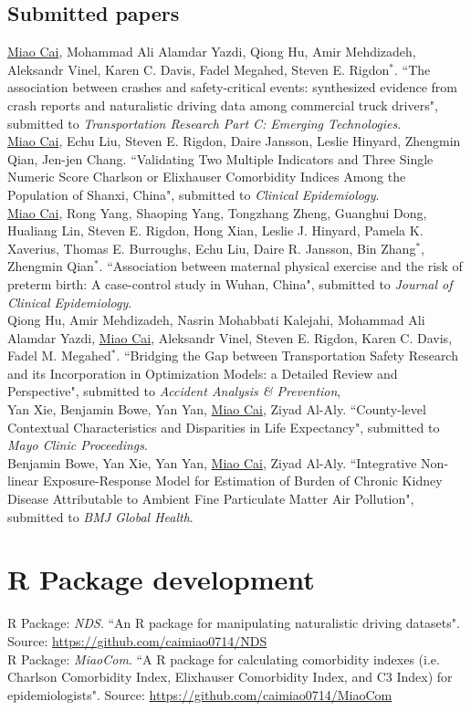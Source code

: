 \documentclass[11pt, a4paper]{article}
\newcommand{\years}[1]{\marginnote{\scriptsize #1}}
\begin{document}
\subsection*{Submitted papers}
\noindent
\years{2019}\underline{Miao Cai},  Mohammad Ali Alamdar Yazdi, Qiong Hu, Amir Mehdizadeh, Aleksandr Vinel, Karen C. Davis, Fadel Megahed, Steven E. Rigdon$^\ast$. ``The association between crashes and safety-critical events: synthesized evidence from crash reports and naturalistic driving data among commercial truck drivers", submitted to \emph{Transportation Research Part C: Emerging Technologies}.\\
\years{2019}\underline{Miao Cai}, Echu Liu, Steven E. Rigdon, Daire Jansson, Leslie Hinyard, Zhengmin Qian, Jen-jen Chang. ``Validating Two Multiple Indicators and Three Single Numeric Score Charlson or Elixhauser Comorbidity Indices Among the Population of Shanxi, China", submitted to \emph{Clinical Epidemiology}.\\
\years{2019}\underline{Miao Cai}, Rong Yang, Shaoping Yang, Tongzhang Zheng, Guanghui Dong, Hualiang Lin, Steven E. Rigdon, Hong Xian, Leslie J. Hinyard, Pamela K. Xaverius, Thomas E. Burroughs, Echu Liu, Daire R. Jansson, Bin Zhang$^\ast$, Zhengmin Qian$^\ast$. ``Association between maternal physical exercise and the risk of preterm birth: A case-control study in Wuhan, China", submitted to \emph{Journal of Clinical Epidemiology}.\\
\years{2019}Qiong Hu, Amir Mehdizadeh, Nasrin Mohabbati Kalejahi, Mohammad Ali Alamdar Yazdi, \underline{Miao Cai}, Aleksandr Vinel, Steven E. Rigdon, Karen C. Davis, Fadel M. Megahed$^\ast$. ``Bridging the Gap between Transportation Safety Research and its Incorporation in Optimization Models: a Detailed Review and Perspective", submitted to \emph{Accident Analysis \& Prevention},\\
\years{2019}Yan Xie, Benjamin Bowe, Yan Yan, \underline{Miao Cai}, Ziyad Al-Aly. ``County-level Contextual Characteristics and Disparities in Life Expectancy", submitted to \emph{Mayo Clinic Proceedings}.\\
\years{2019}Benjamin Bowe, Yan Xie, Yan Yan, \underline{Miao Cai}, Ziyad Al-Aly. ``Integrative Non-linear Exposure-Response Model for Estimation of Burden of Chronic Kidney Disease Attributable to Ambient Fine Particulate Matter Air Pollution", submitted to \emph{BMJ Global Health}.

\clearpage
\section*{R Package development}
\years{2019}R Package: \emph{NDS}. ``An R package for manipulating naturalistic driving datasets". Source: \href{https://github.com/caimiao0714/NDS}{https://github.com/caimiao0714/NDS}\\
\years{2017}R Package: \emph{MiaoCom}. ``A R package for calculating comorbidity indexes (i.e. Charlson Comorbidity Index, Elixhauser Comorbidity Index, and C3 Index) for epidemiologists". Source: \href{https://github.com/caimiao0714/MiaoCom}{https://github.com/caimiao0714/MiaoCom}
\end{document}
